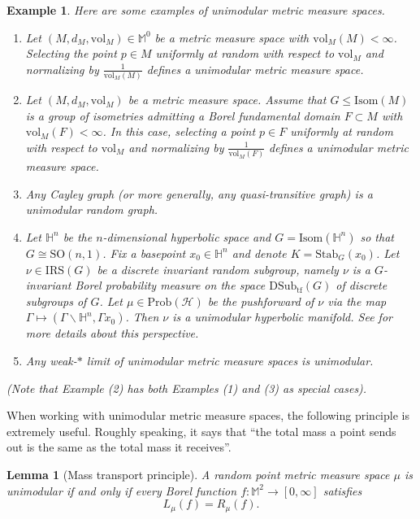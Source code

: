\documentclass{amsart}
\newcommand{\HH}{\mathbb{H}}
\newcommand{\MM}{\mathbb{M}}
\newcommand{\Hypers}{\mathcal{H}}
\newcommand{\vol}{\mathrm{vol}}
\newcommand{\Prob}[1]{\mathrm{Prob}\left(#1\right)}
\newcommand{\IRS}[1]{\mathrm{IRS}\left(#1\right)}
\newcommand{\DSubtf}[1]{\mathrm{DSub}_\mathrm{tf}\left(#1\right)}
\newcommand{\Isom}[1]
{\mathrm{Isom}\left(#1\right)}
\theoremstyle{plain}
\newtheorem{lemma}[theorem]{Lemma}
\newtheorem{example}[theorem]{Example}
\numberwithin{equation}{section}
\theoremstyle{definition}
\begin{document}
\begin{example}
Here are some examples of unimodular  metric measure spaces.
\begin{enumerate}
\item Let $(M,d_M,\vol_M) \in \MM^0$ be a metric measure space with $\vol_M(M) < \infty$. Selecting the point $p \in M$ uniformly at random with respect to $\vol_M$ and normalizing by $\frac{1}{\vol_M(M)}$ defines a unimodular metric measure space.

\item  Let $(M,d_M,\vol_M)$ be a metric measure space. Assume that $G \le \Isom{M}$ is a group of isometries admitting a Borel fundamental domain $F \subset M$ with $\vol_M(F) < \infty$. In this case, selecting a point $p \in F$ uniformly at random with respect to $\vol_M$ and normalizing by $\frac{1}{\vol_M(F)}$ defines a unimodular metric measure space.
\item Any Cayley graph (or more generally, any quasi-transitive graph) is a unimodular random graph.
\item Let $\HH^n$ be the $n$-dimensional hyperbolic space and $G = \Isom{\HH^n}$ so that $G \cong \mathrm{SO}(n,1)$. Fix a basepoint $x_0 \in \HH^n$ and denote $ K =\mathrm{Stab}_G(x_0)$. Let $\nu \in \IRS{G}$ be a discrete invariant random subgroup, namely $\nu$ is a $G$-invariant Borel probability measure on the space $\DSubtf{G}$ of discrete subgroups of $G$.  Let $\mu \in \Prob{\Hypers}$ be the pushforward of $\nu$ via the map $\Gamma \mapsto (\Gamma \backslash \HH^n, \Gamma x_0)$. Then $\nu$ is  a unimodular hyperbolic manifold. See \cite[\S3]{gelander2018invariant} for more details about this perspective.
\item Any weak-$*$ limit of unimodular metric measure spaces is  unimodular. 
\end{enumerate}
(Note that Example (2) has both Examples (1) and (3) as special cases).
\end{example}

When working with unimodular metric measure spaces, the following principle is extremely useful. Roughly speaking, it says that \enquote{the total mass a point sends out is the same as the total mass it receives}. 

\begin{lemma}[Mass transport principle]
\label{lemma:MTP}
A random point metric measure space $\mu$ is unimodular if and only if every Borel function $f : \MM^2 \to \left[0,\infty\right]$ satisfies
\begin{equation}
L_\mu(f) = R_\mu(f).
\end{equation}
\end{lemma}
\end{document}
